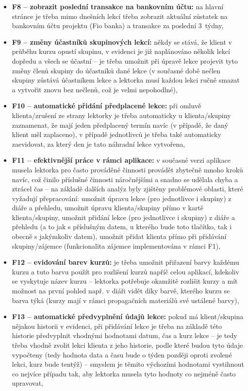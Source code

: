 \begin{itemize}
    \item \textbf{F8 -- zobrazit poslední transakce na bankovním účtu:} na hlavní stránce je třeba mimo dnešních lekcí třeba zobrazit aktuální zůstatek na bankovním účtu projektu (Fio banka) a transakce za poslední 3~týdny,
    \item \textbf{F9 -- změny účastníků skupinových lekcí:} někdy se stává, že klient v průběhu kurzu opustí skupinu, v evidenci je již naplánováno několik lekcí dopředu a všech se účastní -- je třeba umožnit při úpravě lekce projevit tyto změny členů skupiny do účastníků dané lekce (v současné době nečlen skupiny zůstává účastníkem lekce a lektorka musí každou lekci ručně smazat a vytvořit znovu bez nečlenů, což je velmi nepohodlné),
    \item \textbf{F10 -- automatické přidání předplacené lekce:} při omluvě klienta/zrušení ze strany lektorky je třeba automaticky u klienta/skupiny zaznamenat, že mají jeden předplacený termín navíc (v případě, že daný klient měl zaplaceno), v případě jednotlivců je třeba také automaticky zaevidovat, za který den je tato náhradní lekce vytvořena,
    \item \textbf{F11 -- efektivnější práce v rámci aplikace:} v současné verzi aplikace musela lektorka pro často prováděné činnosti provádět zbytečně mnoho kroků navíc, což činilo příslušné činnosti náročnějšími a snadno se udělala chyba a ztrácel čas -- na základě dalších analýz byly zjištěny problémové oblasti, které vyžadují přepracování: umožnit úpravu lekce (pro jednotlivce i skupiny) z diáře a přehledu, umožnit úpravu klienta/skupiny přímo v kartě klienta/skupiny, umožnit přidání lekce (pro jednotlivce i skupiny) z diáře a přehledu (a to jak s příslušným datem, u kterého bude toto tlačítko, tak i obecně s jakýmkoliv datem), umožnit přidat klienta přímo při přidávání skupiny/zájemce (funkcionalita zájemce implementována v rámci F1),
    \item \textbf{F12 -- evidování barev kurzů:} je třeba umožnit přiřazení barvy každému kurzu a tuto barvu použít pro rozlišení kurzů napříč celou aplikací, kdekoliv se vyskytuje název kurzu -- lektorka potřebuje okamžitě rozlišit kurzy a mít možnost na první pohled např. v diáři vidět díky barvě, kterého kurzu se barva týká (kurzy mají v rámci propagačních materiálů své ustálené barvy),
    \item \textbf{F13 -- automatické předvyplnění údajů lekce:} pokud má klient/skupina nějakou historii v evidenci, při přidávání lekce je třeba na základě této historie předvyplnit vhodnými hodnotami datum, čas a kurz lekce -- je tedy třeba vhodně zvolit lekci klienta z jeho historie, podle které budou tyto údaje vypočteny (tedy hodnota data a času bude o týden později oproti zvolené lekci, kurz bude tentýž) -- smyslem je těmito výchozími hodnotami vystihnout co nejvíce případu tak, aby lektorka musela tyto hodnoty co nejméně často upravovat,

\end{itemize}
